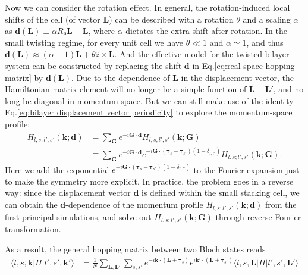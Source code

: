 Now we can consider the rotation effect. In general, the rotation-induced local shifts of the cell (of vector $\bm L$) can be described with a rotation $\theta$ and a scaling $\alpha$ as $\bm d(\bm L)\equiv\alpha R_\theta\bm L-\bm L$, where $\alpha$  dictates the extra shift after rotation. In the small twisting regime, for every unit cell we have $\theta\ll 1$ and $\alpha\simeq1$, and thus $\bm d(\bm L)\approx(\alpha-1)\bm L+\theta\hat z\times\bm L$. And the effective model for the twisted bilayer system can be constructed by replacing the shift $\bm d$ in Eq.\eqref{eq:real-space hopping matrix} by $\bm d(\bm L)$. Due to the dependence of $\bm L$ in the displacement vector, the Hamiltonian matrix element will no longer be a simple function of $\bm L-\bm L'$, and no long be diagonal in momentum space. But we can still make use of the identity Eq.\eqref{eq:bilayer displacement vector periodicity} to explore the momentum-space profile:
\begin{align*}
    H_{l,s;l',s'}(\bm k;\bm d) & = \sum_{\bm G} e^{-i\bm G\cdot\bm d} H_{l,s;l',s'}(\bm k;\bm G)                                                                         \\
                               & \equiv \sum_{\bm G} e^{-i\bm G\cdot\bm d} e^{-i\bm G\cdot(\bm\tau_s-\bm\tau_{s'})(1-\delta_{l,l'})} \tilde{H}_{l,s;l',s'}(\bm k;\bm G).
\end{align*}
Here we add the exponential $e^{-i\bm G\cdot(\bm\tau_s-\bm\tau_{s'})(1-\delta_{l,l'})}$ to the Fourier expansion just to make the symmetry more explicit. In practice, the problem goes in a reverse way: since the displacement vector $\bm d$ is defined within the small stacking cell, we can obtain the $\bm d$-dependence of the momentum profile $H_{l,s;l',s'}(\bm k;\bm d)$ from the first-principal simulations, and solve out $H_{l,s;l',s'}(\bm k;\bm G)$ through reverse Fourier transformation.

As a result, the general hopping matrix between two Bloch states reads
\begin{align*}
    \langle l,s,\bm k|H|l',s',\bm k'\rangle & = \frac{1}{N}\sum_{\bm L,\bm L'}\sum_{s,s'}e^{-i\bm k\cdot(\bm L+\bm\tau_s)}e^{i\bm k'\cdot(\bm L+\bm\tau_{s'})}\langle l,s,\bm L|H|l',s',\bm L'\rangle
\end{align*}

